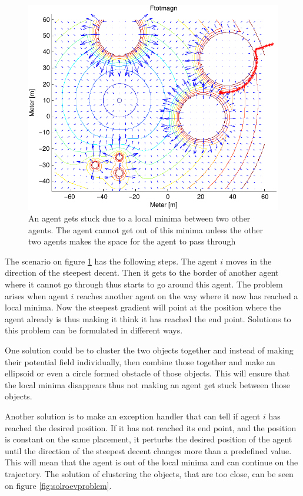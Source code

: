 \documentclass[a4paper,conference]{IEEEtran}
\begin{document}
\begin{figure}[htbp]
  \includegraphics[width=\linewidth]{fig/ftotmagnfigpdf3}
	\caption{An agent gets stuck due to a local minima between two other
	agents. The agent cannot get out of this minima unless the other two
	agents makes the space for the agent to pass through}
  \label{fig:roevproblem}
\end{figure}

The scenario on figure \ref{fig:roevproblem} has the following steps.
The agent $i$ moves in the direction of the steepest decent. Then it
gets to the border of another agent where it cannot go through thus
starts to go around this agent. The problem arises when agent $i$
reaches another agent on the way where it now has reached a local
minima. Now the steepest gradient will point at the position where the
agent already is thus making it think it has reached the end point.
Solutions to this problem can be formulated in different ways.

One solution could be to cluster the two objects together and instead
of making their potential field individually, then combine those
together and make an ellipsoid or even a circle formed obstacle of
those objects. This will ensure that the local minima disappears thus
not making an agent get stuck between those objects.

Another solution is to make an exception handler that can tell if
agent $i$ has reached the desired position. If it has not reached its
end point, and the position is constant on the same placement, it
perturbs the desired position of the agent until the direction of the
steepest decent changes more than a predefined value. This will mean
that the agent is out of the local minima and can continue on the
trajectory.  The solution of clustering the objects, that are too
close, can be seen on figure \ref{fig:solroevproblem}.
\end{document}
